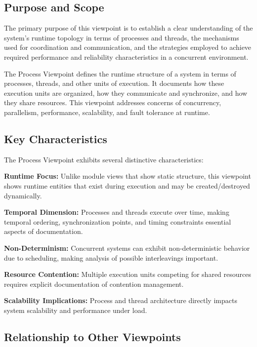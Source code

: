 \documentclass[11pt,letterpaper]{article}
\begin{document}
\subsection{Purpose and Scope}

The primary purpose of this viewpoint is to establish a clear understanding of the system's runtime topology in terms of processes and threads, the mechanisms used for coordination and communication, and the strategies employed to achieve required performance and reliability characteristics in a concurrent environment.

\begin{definitionbox}
The Process Viewpoint defines the runtime structure of a system in terms of processes, threads, and other units of execution. It documents how these execution units are organized, how they communicate and synchronize, and how they share resources. This viewpoint addresses concerns of concurrency, parallelism, performance, scalability, and fault tolerance at runtime.
\end{definitionbox}

\subsection{Key Characteristics}

The Process Viewpoint exhibits several distinctive characteristics:

\textbf{Runtime Focus:} Unlike module views that show static structure, this viewpoint shows runtime entities that exist during execution and may be created/destroyed dynamically.

\textbf{Temporal Dimension:} Processes and threads execute over time, making temporal ordering, synchronization points, and timing constraints essential aspects of documentation.

\textbf{Non-Determinism:} Concurrent systems can exhibit non-deterministic behavior due to scheduling, making analysis of possible interleavings important.

\textbf{Resource Contention:} Multiple execution units competing for shared resources requires explicit documentation of contention management.

\textbf{Scalability Implications:} Process and thread architecture directly impacts system scalability and performance under load.

\subsection{Relationship to Other Viewpoints}
\end{document}
